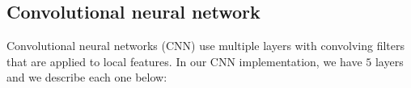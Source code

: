 \documentclass[8pt,conference,compsocconf]{IEEEtran}
\begin{document}
\subsection{Convolutional neural network}
Convolutional neural networks (CNN) use multiple layers with convolving filters that are applied to local features. In our CNN implementation, we have $5$ layers and we describe each one below:

\end{document}
